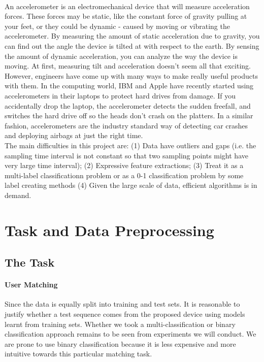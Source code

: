 \documentclass[11pt,letterpaper]{article}
\begin{document}
\paragraph{} An accelerometer is an electromechanical device that will measure acceleration forces. These forces may be static, like the constant force of gravity pulling at your feet, or they could be dynamic - caused by moving or vibrating the accelerometer. By measuring the amount of static acceleration due to gravity, you can find out the angle the device is tilted at with respect to the earth. By sensing the amount of dynamic acceleration, you can analyze the way the device is moving. At first, measuring tilt and acceleration doesn't seem all that exciting. However, engineers have come up with many ways to make really useful products with them. In the computing world, IBM and Apple have recently started using accelerometers in their laptops to protect hard drives from damage. If you accidentally drop the laptop, the accelerometer detects the sudden freefall, and switches the hard drive off so the heads don't crash on the platters. In a similar fashion, accelerometers are the industry standard way of detecting car crashes and deploying airbags at just the right time.\\

The main difficulties in this project are: (1) Data have outliers and gaps (i.e. the sampling time interval is not constant so that two sampling points might have very large time interval); (2) Expressive feature extractions; (3) Treat it as a multi-label classificationn problem or as a 0-1 classification problem by some label creating methods (4) Given the large scale of data, efficient algorithms is in demand.

\section{Task and Data Preprocessing}
\label{sec:taskAndData}

\subsection{The Task}
\label{sec:task}
\paragraph{User Matching} Since the data is equally split into training and test sets. It is reasonable to justify whether a test sequence comes from the proposed device using models learnt from training sets. Whether we took a multi-classification or binary classification approach remains to be seen from experiments we will conduct. We are prone to use binary classification because it is less expensive and more intuitive towards this particular matching task.
\end{document}
